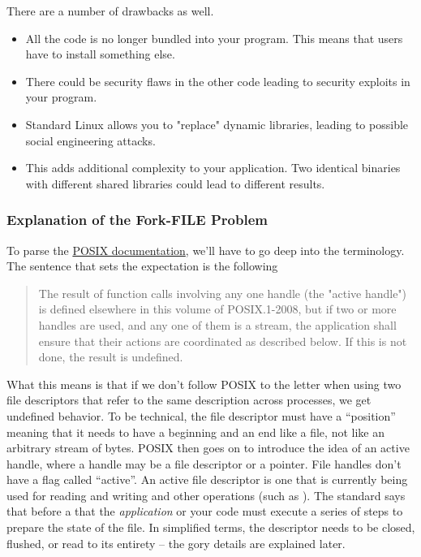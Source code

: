 There are a number of drawbacks as well.

\begin{itemize}
\item All the code is no longer bundled into your program. This means that users have to install something else.
\item There could be security flaws in the other code leading to security exploits in your program.
\item Standard Linux allows you to "replace" dynamic libraries, leading to possible social engineering attacks.
\item This adds additional complexity to your application. Two identical binaries with different shared libraries could lead to different results.
\end{itemize}



\subsubsection{Explanation of the Fork-FILE Problem}

To parse the \href{http://pubs.opengroup.org/onlinepubs/9699919799.2008edition/functions/V2_chap02.html}{POSIX documentation}, we'll have to go deep into the terminology.
The sentence that sets the expectation is the following

\begin{quote}
The result of function calls involving any one handle (the "active handle") is defined elsewhere in this volume of POSIX.1-2008, but if two or more handles are used, and any one of them is a stream, the application shall ensure that their actions are coordinated as described below. If this is not done, the result is undefined.
\end{quote}

What this means is that if we don't follow POSIX to the letter when using two file descriptors that refer to the same description across processes, we get undefined behavior.
To be technical, the file descriptor must have a ``position'' meaning that it needs to have a beginning and an end like a file, not like an arbitrary stream of bytes.
POSIX then goes on to introduce the idea of an active handle, where a handle may be a file descriptor or a  pointer.
File handles don't have a flag called ``active''.
An active file descriptor is one that is currently being used for reading and writing and other operations (such as ).
The standard says that before a  that the \textit{application} or your code must execute a series of steps to prepare the state of the file.
In simplified terms, the descriptor needs to be closed, flushed, or read to its entirety -- the gory details are explained later.

